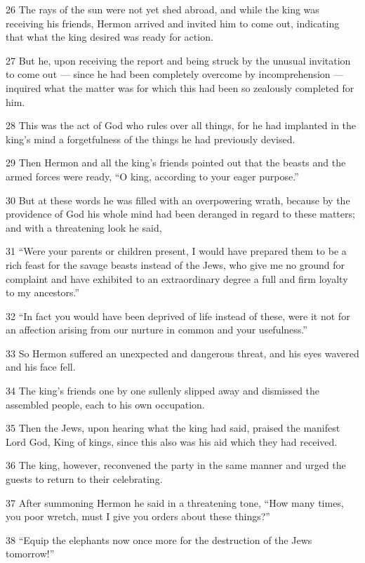 \par 26 The rays of the sun were not yet shed abroad, and while the king was receiving his friends, Hermon arrived and invited him to come out, indicating that what the king desired was ready for action.
\par 27 But he, upon receiving the report and being struck by the unusual invitation to come out — since he had been completely overcome by incomprehension — inquired what the matter was for which this had been so zealously completed for him.
\par 28 This was the act of God who rules over all things, for he had implanted in the king's mind a forgetfulness of the things he had previously devised.
\par 29 Then Hermon and all the king's friends pointed out that the beasts and the armed forces were ready, “O king, according to your eager purpose.”
\par 30 But at these words he was filled with an overpowering wrath, because by the providence of God his whole mind had been deranged in regard to these matters; and with a threatening look he said,
\par 31 “Were your parents or children present, I would have prepared them to be a rich feast for the savage beasts instead of the Jews, who give me no ground for complaint and have exhibited to an extraordinary degree a full and firm loyalty to my ancestors.”
\par 32 “In fact you would have been deprived of life instead of these, were it not for an affection arising from our nurture in common and your usefulness.”
\par 33 So Hermon suffered an unexpected and dangerous threat, and his eyes wavered and his face fell.
\par 34 The king's friends one by one sullenly slipped away and dismissed the assembled people, each to his own occupation.
\par 35 Then the Jews, upon hearing what the king had said, praised the manifest Lord God, King of kings, since this also was his aid which they had received.
\par 36 The king, however, reconvened the party in the same manner and urged the guests to return to their celebrating.
\par 37 After summoning Hermon he said in a threatening tone, “How many times, you poor wretch, must I give you orders about these things?”
\par 38 “Equip the elephants now once more for the destruction of the Jews tomorrow!”
